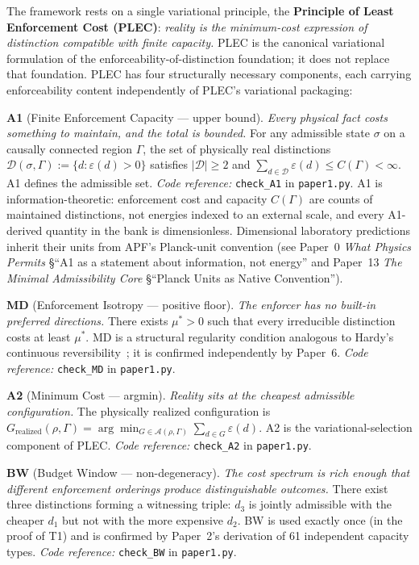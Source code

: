 \documentclass[11pt]{article}
\theoremstyle{remark}
\newcommand{\coderef}[2]{\smallskip\noindent\textit{Code reference:} \texttt{#1} in \texttt{#2}.}
\begin{document}
\begin{tcolorbox}[apfbox, title={The Principle of Least Enforcement Cost: four structurally necessary components}]

The framework rests on a single variational principle, the \textbf{Principle of Least Enforcement Cost (PLEC)}: \textit{reality is the minimum-cost expression of distinction compatible with finite capacity.}  PLEC is the canonical variational formulation of the enforceability-of-distinction foundation; it does not replace that foundation.  PLEC has four structurally necessary components, each carrying enforceability content independently of PLEC's variational packaging:

\medskip
\textbf{A1} (Finite Enforcement Capacity --- upper bound).  \textit{Every physical fact costs something to maintain, and the total is bounded.}  For any admissible state $\sigma$ on a causally connected region $\Gamma$, the set of physically real distinctions $\mathcal{D}(\sigma,\Gamma) := \{d : \varepsilon(d) > 0\}$ satisfies $|\mathcal{D}| \ge 2$ and $\sum_{d \in \mathcal{D}} \varepsilon(d) \le C(\Gamma) < \infty$.  A1 defines the admissible set.  \coderef{check\_A1}{paper1.py}  A1 is information-theoretic: enforcement cost and capacity $C(\Gamma)$ are counts of maintained distinctions, not energies indexed to an external scale, and every A1-derived quantity in the bank is dimensionless.  Dimensional laboratory predictions inherit their units from APF's Planck-unit convention (see Paper~0 \emph{What Physics Permits} \S``A1 as a statement about information, not energy'' and Paper~13 \emph{The Minimal Admissibility Core} \S``Planck Units as Native Convention'').

\medskip
\textbf{MD} (Enforcement Isotropy --- positive floor).  \textit{The enforcer has no built-in preferred directions.}  There exists $\mu^* > 0$ such that every irreducible distinction costs at least $\mu^*$.  MD is a structural regularity condition analogous to Hardy's continuous reversibility~\cite{Hardy2001}; it is confirmed independently by Paper~6.  \coderef{check\_MD}{paper1.py}

\medskip
\textbf{A2} (Minimum Cost --- argmin).  \textit{Reality sits at the cheapest admissible configuration.}  The physically realized configuration is $G_{\mathrm{realized}}(\rho, \Gamma) = \arg\min_{G \in \mathcal{A}(\rho, \Gamma)} \sum_{d \in G} \varepsilon(d)$.  A2 is the variational-selection component of PLEC.  \coderef{check\_A2}{paper1.py}

\medskip
\textbf{BW} (Budget Window --- non-degeneracy).  \textit{The cost spectrum is rich enough that different enforcement orderings produce distinguishable outcomes.}  There exist three distinctions forming a witnessing triple: $d_3$ is jointly admissible with the cheaper $d_1$ but not with the more expensive $d_2$.  BW is used exactly once (in the proof of T1) and is confirmed by Paper~2's derivation of 61 independent capacity types.  \coderef{check\_BW}{paper1.py}


\end{tcolorbox}
\end{document}
